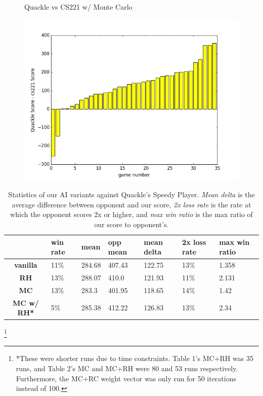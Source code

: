 \documentclass[12pt]{article}
\begin{document}
\begin{figure}[h!]
  \caption{\footnotesize{Quackle vs CS221 w/ Monte Carlo}}
  \endminipage
      \centering
  \includegraphics[scale=0.39]{../images/quacklegame_MC-RH_35}\\
   \caption{}
  \endminipage{}
\end{figure}


\begin{table}[h!]
  \centering
  \begin{tabular}{c|l|l|l|l|l|l}
    \textbf{} & \textbf{win rate} & \textbf{mean} & \textbf{opp mean} & \textbf{mean delta} &  \textbf{2x loss rate} & \textbf{max win ratio} \\\hline
  \textbf{vanilla}   & 11\% & 284.68 & 407.43 & 122.75 & 13\% & 1.358\\
  \textbf{RH}        & 13\% & 288.07 & 410.0  & 121.93 & 11\% & 2.131\\
  \textbf{MC}        & 13\% & 283.3  & 401.95 & 118.65 & 14\% & 1.42 \\
  \textbf{MC w/ RH*} & 5\%  & 285.38 & 412.22 & 126.83 & 13\% & 2.34 \\
\end{tabular}
  \caption{Statistics of our AI variants against Quackle's Speedy
    Player. \emph{Mean delta} is the average difference between
    opponent and our score, \emph{2x loss rate} is the rate at which
    the opponent scores 2x or higher, and \emph{max win ratio} is the
    max ratio of our score to opponent's.}
\end{table}\footnote[]{*These were shorter runs due to time constraints. Table 1's MC+RH was 35 runs, and Table 2's MC and MC+RH were 80 and 53 runs respectively. Furthermore, the MC+RC weight vector was only run for 50 iterations instead of 100.}
\end{document}
